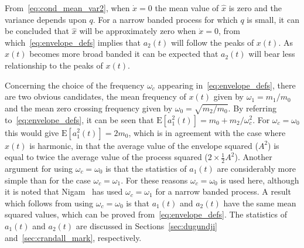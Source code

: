 \documentclass[12pt]{article}
\theoremstyle{plain}
\theoremstyle{definition}
\theoremstyle{remark}
\begin{document}
From~\eqref{eq:cond_mean_var2}, when $\dot{x}=0$ the mean value of $\hat{x}$ is zero and the variance depends upon $q$. For a narrow banded process for which $q$ is small, it can be concluded that $\hat{x}$ will be approximately zero when $\dot{x}=0$, from which~\eqref{eq:envelope_defs} implies that $a_2(t)$ will follow the peaks of $x(t)$. As $x(t)$ becomes more broad banded it can be expected that $a_2(t)$ will bear less relationship to the peaks of $x(t)$.

Concerning the choice of the frequency $\omega_c$ appearing in~\eqref{eq:envelope_defs}, there are two obvious candidates, the mean frequency of $x(t)$ given by $\omega_1 = m_1 / m_0$ and the mean zero crossing frequency given by $\omega_0 = \sqrt{m_2 / m_0}$. By referring to~\eqref{eq:envelope_defs}, it can be seen that $\mathrm{E}[a_1^2(t)] = m_0 + m_2 / \omega_c^2$. For $\omega_c = \omega_0$ this would give $\mathrm{E}[a_1^2(t)] = 2 m_0$, which is in agreement with the case where $x(t)$ is harmonic, in that the average value of the envelope squared ($A^2$) is equal to twice the average value of the process squared ($2 \times \frac{1}{2}A^2$). Another argument for using $\omega_c = \omega_0$ is that the statistics of $a_1(t)$ are considerably more simple than for the case $\omega_c = \omega_1$. For these reasons $\omega_c = \omega_0$ is used here, although it is noted that Nigam~\cite{nigam1983} has used $\omega_c = \omega_1$ for a narrow banded process. A result which follows from using $\omega_c = \omega_0$ is that $a_1(t)$ and $a_2(t)$ have the same mean squared values, which can be proved from~\eqref{eq:envelope_defs}. The statistics of $a_1(t)$ and $a_2(t)$ are discussed in Sections~\ref{sec:dugundji} and~\ref{sec:crandall_mark}, respectively.
\end{document}
